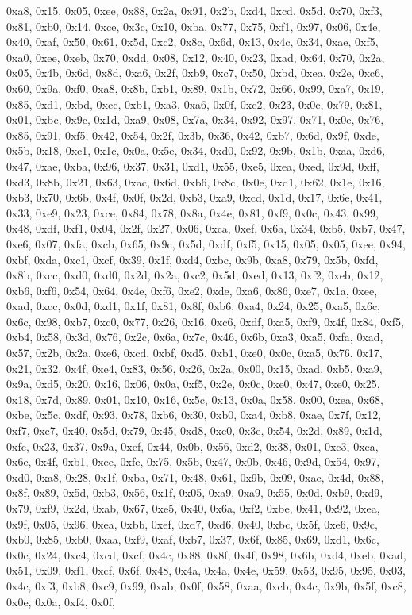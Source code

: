 \documentclass[
]{book}
\begin{document}
0xa8, 0x15, 0x05, 0xee, 0x88, 0x2a, 0x91, 0x2b, 0xd4, 0xcd, 0x5d, 0x70, 0xf3, 0x81, 0xb0, 0x14, 0xce, 0x3c, 0x10, 0xba, 0x77, 0x75, 0xf1, 0x97, 0x06, 0x4e, 0x40, 0xaf, 0x50, 0x61, 0x5d, 0xc2, 0x8c, 0x6d, 0x13, 0x4c, 0x34, 0xae, 0xf5, 0xa0, 0xee, 0xeb, 0x70, 0xdd, 0x08, 0x12, 0x40, 0x23, 0xad, 0x64, 0x70, 0x2a, 0x05, 0x4b, 0x6d, 0x8d, 0xa6, 0x2f, 0xb9, 0xc7, 0x50, 0xbd, 0xea, 0x2e, 0xc6, 0x60, 0x9a, 0xf0, 0xa8, 0x8b, 0xb1, 0x89, 0x1b, 0x72, 0x66, 0x99, 0xa7, 0x19, 0x85, 0xd1, 0xbd, 0xcc, 0xb1, 0xa3,
0xa6, 0x0f, 0xc2, 0x23, 0x0c, 0x79, 0x81, 0x01, 0xbc, 0x9c, 0x1d, 0xa9, 0x08, 0x7a, 0x34, 0x92, 0x97, 0x71, 0x0e, 0x76, 0x85, 0x91, 0xf5, 0x42, 0x54, 0x2f, 0x3b, 0x36, 0x42, 0xb7, 0x6d, 0x9f, 0xde, 0x5b, 0x18, 0xc1, 0x1c, 0x0a, 0x5e, 0x34, 0xd0, 0x92, 0x9b, 0x1b, 0xaa, 0xd6, 0x47, 0xae, 0xba, 0x96, 0x37, 0x31, 0xd1, 0x55, 0xe5, 0xea, 0xed, 0x9d, 0xff, 0xd3, 0x8b, 0x21, 0x63, 0xac, 0x6d, 0xb6, 0x8c, 0x0e, 0xd1, 0x62, 0x1e, 0x16, 0xb3, 0x70, 0x6b, 0x4f, 0x0f, 0x2d, 0xb3, 0xa9, 0xcd, 0x1d, 0x17, 0x6e,
0x41, 0x33, 0xe9, 0x23, 0xce, 0x84, 0x78, 0x8a, 0x4e, 0x81, 0xf9, 0x0c, 0x43, 0x99, 0x48, 0xdf, 0xf1, 0x04, 0x2f, 0x27, 0x06, 0xca, 0xef, 0x6a, 0x34, 0xb5, 0xb7, 0x47, 0xe6, 0x07, 0xfa, 0xcb, 0x65, 0x9c, 0x5d, 0xdf, 0xf5, 0x15, 0x05, 0x05, 0xee, 0x94, 0xbf, 0xda, 0xc1, 0xcf, 0x39, 0x1f, 0xd4, 0xbc, 0x9b, 0xa8, 0x79, 0x5b, 0xfd, 0x8b, 0xcc, 0xd0, 0xd0, 0x2d, 0x2a, 0xc2, 0x5d, 0xed, 0x13, 0xf2, 0xeb, 0x12, 0xb6, 0xf6, 0x54, 0x64, 0x4e, 0xf6, 0xe2, 0xde, 0xa6, 0x86, 0xe7, 0x1a, 0xee, 0xad, 0xcc, 0x0d,
0xd1, 0x1f, 0x81, 0x8f, 0xb6, 0xa4, 0x24, 0x25, 0xa5, 0x6c, 0x6c, 0x98, 0xb7, 0xc0, 0x77, 0x26, 0x16, 0xc6, 0xdf, 0xa5, 0xf9, 0x4f, 0x84, 0xf5, 0xb4, 0x58, 0x3d, 0x76, 0x2c, 0x6a, 0x7c, 0x46, 0x6b, 0xa3, 0xa5, 0xfa, 0xad, 0x57, 0x2b, 0x2a, 0xe6, 0xcd, 0xbf, 0xd5, 0xb1, 0xe0, 0x0c, 0xa5, 0x76, 0x17, 0x21, 0x32, 0x4f, 0xe4, 0x83, 0x56, 0x26, 0x2a, 0x00, 0x15, 0xad, 0xb5, 0xa9, 0x9a, 0xd5, 0x20, 0x16, 0x06, 0x0a, 0xf5, 0x2e, 0x0c, 0xe0, 0x47, 0xe0, 0x25, 0x18, 0x7d, 0x89, 0x01, 0x10, 0x16, 0x5c, 0x13,
0x0a, 0x58, 0x00, 0xea, 0x68, 0xbe, 0x5c, 0xdf, 0x93, 0x78, 0xb6, 0x30, 0xb0, 0xa4, 0xb8, 0xae, 0x7f, 0x12, 0xf7, 0xc7, 0x40, 0x5d, 0x79, 0x45, 0xd8, 0xc0, 0x3e, 0x54, 0x2d, 0x89, 0x1d, 0xfc, 0x23, 0x37, 0x9a, 0xef, 0x44, 0x0b, 0x56, 0xd2, 0x38, 0x01, 0xc3, 0xea, 0x6e, 0x4f, 0xb1, 0xee, 0xfe, 0x75, 0x5b, 0x47, 0x0b, 0x46, 0x9d, 0x54, 0x97, 0xd0, 0xa8, 0x28, 0x1f, 0xba, 0x71, 0x48, 0x61, 0x9b, 0x09, 0xac, 0x4d, 0x88, 0x8f, 0x89, 0x5d, 0xb3, 0x56, 0x1f, 0x05, 0xa9, 0xa9, 0x55, 0x0d, 0xb9, 0xd9, 0x79,
0xf9, 0x2d, 0xab, 0x67, 0xe5, 0x40, 0x6a, 0xf2, 0xbe, 0x41, 0x92, 0xea, 0x9f, 0x05, 0x96, 0xea, 0xbb, 0xef, 0xd7, 0xd6, 0x40, 0xbc, 0x5f, 0xe6, 0x9c, 0xb0, 0x85, 0xb0, 0xaa, 0xf9, 0xaf, 0xb7, 0x37, 0x6f, 0x85, 0x69, 0xd1, 0x6c, 0x0c, 0x24, 0xc4, 0xcd, 0xcf, 0x4c, 0x88, 0x8f, 0x4f, 0x98, 0x6b, 0xd4, 0xeb, 0xad, 0x51, 0x09, 0xf1, 0xcf, 0x6f, 0x48, 0x4a, 0x4a, 0x4e, 0x59, 0x53, 0x95, 0x95, 0x03, 0x4c, 0xf3, 0xb8, 0xc9, 0x99, 0xab, 0x0f, 0x58, 0xaa, 0xcb, 0x4c, 0x9b, 0x5f, 0xc8, 0x0e, 0x0a, 0xf4, 0x0f,
\end{document}
